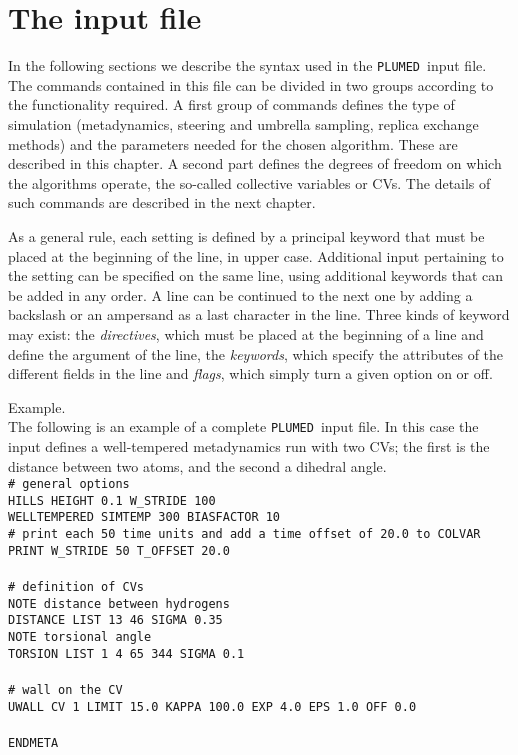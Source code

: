 \documentclass[12pt,fleqn]{report}
\newcommand{\plumed}{{\tt PLUMED}}
\newcommand{\esempio}[1]{
\vspace{10pt}
\begin{flushright}
\colorbox{light-gray}{
   \begin{minipage}{13cm}
       \scriptsize{
{\fontfamily{phv} \fontseries{b}
 \selectfont Example. \\
 \fontseries{m} \selectfont #1 } }
\end{minipage}}
\end{flushright}
\vspace{20pt}
}
\begin{document}
\section{The input file}
In the following sections we describe the syntax used in the \plumed \ input file.
The commands contained in this file can be divided in two groups according to the
functionality required.
A first group of commands defines the type of simulation (metadynamics, steering
and umbrella sampling, replica exchange methods) and the parameters needed for
the chosen algorithm. These are described in this chapter.  A second part  defines 
the degrees of freedom on which the algorithms operate, the so-called 
collective variables or CVs. The details of such commands are described in the
next chapter.

As a general rule, each setting is defined by a principal keyword that must be
placed at the beginning of the line, in upper case. Additional input pertaining
to the setting can be specified on the same line, using additional keywords
that can be added in any order. A line can be continued to the next one by adding
a backslash or an ampersand as a last character in the line.
Three kinds of keyword may exist: the \emph{directives}, 
which must be placed at the beginning of a line and define the argument of the line, the
\emph{keywords}, which specify the attributes of the different fields in the line
and \emph{flags}, which simply turn a given option on or off.

\esempio{The following is an example of a complete \plumed  \ input file. In this case
the input defines a well-tempered metadynamics run with two CVs; the first 
is the distance between two atoms, and the second a dihedral angle. \vspace{10pt} \\
{\tt \# general options  \\
HILLS HEIGHT 0.1 W\_STRIDE 100 \\
WELLTEMPERED SIMTEMP 300 BIASFACTOR 10 \\

\# print each 50 time units and add a time offset of 20.0 to COLVAR \\
PRINT W\_STRIDE 50  T\_OFFSET 20.0 \\
\\
\# definition of CVs \\

NOTE distance between hydrogens \\
DISTANCE LIST 13 46 SIGMA 0.35 \\

NOTE torsional angle \\
TORSION LIST 1 4 65 344 SIGMA 0.1 \\
\\
\# wall on the CV\\
UWALL CV 1 LIMIT  15.0 KAPPA 100.0 EXP 4.0 EPS 1.0 OFF 0.0 \\
\\
ENDMETA
}}
\end{document}

